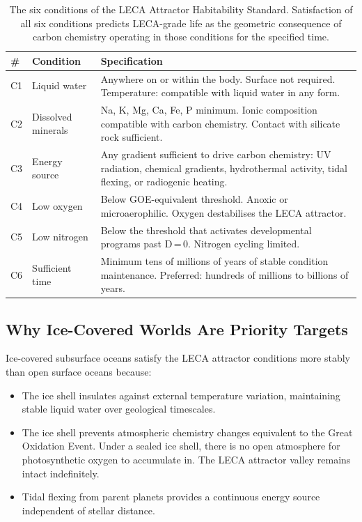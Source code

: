 \documentclass[11pt, a4paper]{article}
\begin{document}
\begin{table}[h]
\centering
\small
\begin{tabularx}{\linewidth}{p{0.5cm}p{2.8cm}X}
\toprule
\textbf{\#} & \textbf{Condition} & \textbf{Specification} \\
\midrule
C1 & Liquid water &
  Anywhere on or within the body.
  Surface not required.
  Temperature: compatible with
  liquid water in any form. \\[0.3em]
C2 & Dissolved minerals &
  Na, K, Mg, Ca, Fe, P minimum.
  Ionic composition compatible
  with carbon chemistry.
  Contact with silicate rock sufficient. \\[0.3em]
C3 & Energy source &
  Any gradient sufficient to drive
  carbon chemistry: UV radiation,
  chemical gradients, hydrothermal
  activity, tidal flexing, or
  radiogenic heating. \\[0.3em]
C4 & Low oxygen &
  Below GOE-equivalent threshold.
  Anoxic or microaerophilic.
  Oxygen destabilises the LECA attractor. \\[0.3em]
C5 & Low nitrogen &
  Below the threshold that activates
  developmental programs past D\,=\,0.
  Nitrogen cycling limited. \\[0.3em]
C6 & Sufficient time &
  Minimum tens of millions of years
  of stable condition maintenance.
  Preferred: hundreds of millions
  to billions of years. \\
\bottomrule
\end{tabularx}
\caption{The six conditions of the LECA Attractor
  Habitability Standard. Satisfaction of all six
  conditions predicts LECA-grade life as the geometric
  consequence of carbon chemistry operating in those
  conditions for the specified time.}
\end{table}

\subsection{Why Ice-Covered Worlds Are
Priority Targets}

Ice-covered subsurface oceans satisfy the LECA attractor
conditions more stably than open surface oceans because:

\begin{itemize}[leftmargin=*]
\item The ice shell insulates against external temperature
  variation, maintaining stable liquid water over
  geological timescales.
\item The ice shell prevents atmospheric chemistry changes
  equivalent to the Great Oxidation Event. Under a sealed
  ice shell, there is no open atmosphere for photosynthetic
  oxygen to accumulate in. The LECA attractor valley
  remains intact indefinitely.
\item Tidal flexing from parent planets provides a
  continuous energy source independent of stellar distance.
\end{itemize}
\end{document}
